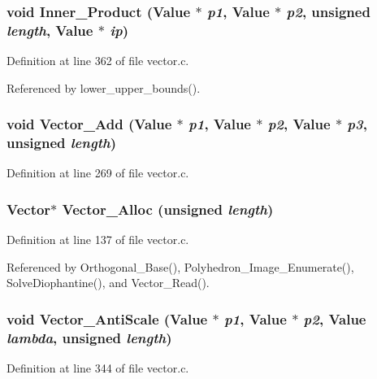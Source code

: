 \subsubsection{\setlength{\rightskip}{0pt plus 5cm}void Inner\_\-Product (Value $\ast$ {\em p1}, Value $\ast$ {\em p2}, unsigned {\em length}, Value $\ast$ {\em ip})}\label{vector_8c_a17}




Definition at line 362 of file vector.c.

Referenced by lower\_\-upper\_\-bounds().

\subsubsection{\setlength{\rightskip}{0pt plus 5cm}void Vector\_\-Add (Value $\ast$ {\em p1}, Value $\ast$ {\em p2}, Value $\ast$ {\em p3}, unsigned {\em length})}\label{vector_8c_a12}




Definition at line 269 of file vector.c.
\subsubsection{\setlength{\rightskip}{0pt plus 5cm}Vector$\ast$ Vector\_\-Alloc (unsigned {\em length})}\label{vector_8c_a5}




Definition at line 137 of file vector.c.

Referenced by Orthogonal\_\-Base(), Polyhedron\_\-Image\_\-Enumerate(), Solve\-Diophantine(), and Vector\_\-Read().

\subsubsection{\setlength{\rightskip}{0pt plus 5cm}void Vector\_\-Anti\-Scale (Value $\ast$ {\em p1}, Value $\ast$ {\em p2}, Value {\em lambda}, unsigned {\em length})}\label{vector_8c_a16}




Definition at line 344 of file vector.c.
